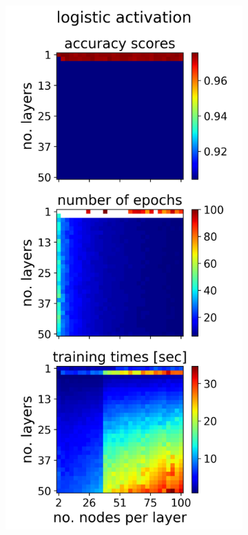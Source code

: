 \documentclass[nofootinbib,reprint,english]{revtex4-1}
\begin{document}
~
\begin{figure}[h!]
\centering
	\begin{subfigure}{0.32\textwidth}
	\centering
	\includegraphics[scale=0.38]{../results/NN/img/gridsearch1_logistic1.png}

\end{subfigure}
\end{figure}
\end{document}
